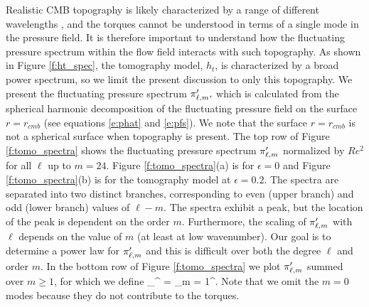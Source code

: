 Realistic CMB topography is likely characterized by a range of different wavelengths \citep{mP23,rM25,vD25}, and the torques cannot be understood in terms of a single mode in the pressure field. It is therefore important to understand how the fluctuating pressure spectrum within the flow field interacts with such topography. As shown in Figure \ref{f:ht_spec}, the tomography model, $h_t$, is characterized by a broad power spectrum, so we limit the present discussion to only this topography.
We present the fluctuating pressure spectrum $\pi^{\prime}_{\ell,m},$ which is calculated from the spherical harmonic decomposition of the fluctuating pressure field on the surface $r = r_{cmb}$ (see equations \eqref{e:phat} and \eqref{e:pfs}).
We note that the surface $r = r_{cmb}$ is not a spherical surface when topography is present. 
The top row of Figure \ref{f:tomo_spectra} shows the fluctuating pressure spectrum $\pi^{\prime}_{\ell,m}$ normalized by $Re^{2}$ for all $\ell$ up to $m = 24.$ 
Figure \ref{f:tomo_spectra}(a) is for $\epsilon  =0 $ and Figure \ref{f:tomo_spectra}(b) is for the tomography model at  $\epsilon  = 0.2$. The spectra are separated into two distinct branches, corresponding to even (upper branch) and odd (lower branch) values of $\ell-m.$ 
The spectra exhibit a peak, but the location of the peak is dependent on the order $m.$
Furthermore, the scaling of $\pi^{\prime}_{\ell,m}$ with $\ell$ depends on the value of $m$ (at least at low wavenumber).
Our goal is to determine a power law for $\pi^{\prime}_{\ell,m}$ and this is difficult over both the degree $\ell$ and order $m.$
In the bottom row of Figure \ref{f:tomo_spectra} we plot $\pi^{\prime}_{\ell,m}$ summed over $m\geq1$, for which we define
 \be
 \Pi_{\ell}^{\prime} = \sum_{m = 1}^{\ell}\phatLM.
 \label{e:sum_m}
 \ee
 Note that we omit the $m=0$ modes because they do not contribute to the torques.

